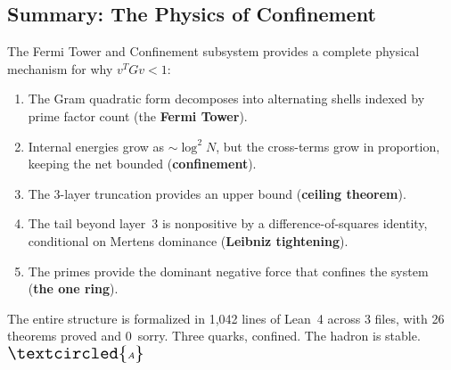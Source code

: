 \subsection{Summary: The Physics of Confinement}

The Fermi Tower and Confinement subsystem provides a complete
physical mechanism for why $v^T G v < 1$:

\begin{enumerate}
  \item The Gram quadratic form decomposes into alternating shells
    indexed by prime factor count (the \textbf{Fermi Tower}).
  \item Internal energies grow as $\sim\!\log^2 N$, but the cross-terms
    grow in proportion, keeping the net bounded (\textbf{confinement}).
  \item The 3-layer truncation provides an upper bound
    (\textbf{ceiling theorem}).
  \item The tail beyond layer~3 is nonpositive by a difference-of-squares
    identity, conditional on Mertens dominance
    (\textbf{Leibniz tightening}).
  \item The primes provide the dominant negative force that
    confines the system (\textbf{the one ring}).
\end{enumerate}

The entire structure is formalized in 1,042 lines of Lean~4
across 3 files, with 26 theorems proved and 0~sorry.
Three quarks, confined. The hadron is stable. \(\text{\Large $\textcircled{\scriptsize\textit{A}}$}\)

